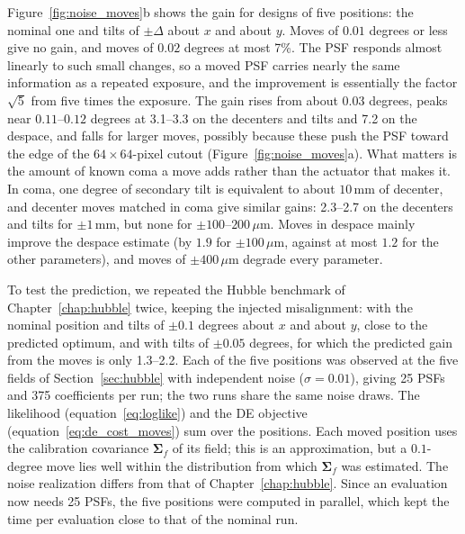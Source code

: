 Figure~\ref{fig:noise_moves}b shows the gain for designs of five positions: the nominal one and tilts of $\pm\Delta$ about $x$ and about $y$. Moves of $0.01$ degrees or less give no gain, and moves of $0.02$ degrees at most 7\%. The PSF responds almost linearly to such small changes, so a moved PSF carries nearly the same information as a repeated exposure, and the improvement is essentially the factor $\sqrt{5}$ from five times the exposure. The gain rises from about $0.03$ degrees, peaks near $0.11$--$0.12$ degrees at 3.1--3.3 on the decenters and tilts and 7.2 on the despace, and falls for larger moves, possibly because these push the PSF toward the edge of the $64\times64$-pixel cutout (Figure~\ref{fig:noise_moves}a). What matters is the amount of known coma a move adds rather than the actuator that makes it. In coma, one degree of secondary tilt is equivalent to about $10$\,mm of decenter, and decenter moves matched in coma give similar gains: 2.3--2.7 on the decenters and tilts for $\pm1$\,mm, but none for $\pm100$--$200\,\mu\mathrm{m}$. Moves in despace mainly improve the despace estimate (by $1.9$ for $\pm100\,\mu\mathrm{m}$, against at most $1.2$ for the other parameters), and moves of $\pm400\,\mu\mathrm{m}$ degrade every parameter.

To test the prediction, we repeated the Hubble benchmark of Chapter~\ref{chap:hubble} twice, keeping the injected misalignment: with the nominal position and tilts of $\pm0.1$ degrees about $x$ and about $y$, close to the predicted optimum, and with tilts of $\pm0.05$ degrees, for which the predicted gain from the moves is only 1.3--2.2. Each of the five positions was observed at the five fields of Section~\ref{sec:hubble} with independent noise ($\sigma=0.01$), giving 25 PSFs and 375 coefficients per run; the two runs share the same noise draws. The likelihood (equation~\ref{eq:loglike}) and the DE objective (equation~\ref{eq:de_cost_moves}) sum over the positions. Each moved position uses the calibration covariance $\boldsymbol{\Sigma}_f$ of its field; this is an approximation, but a $0.1$-degree move lies well within the distribution from which $\boldsymbol{\Sigma}_f$ was estimated. The noise realization differs from that of Chapter~\ref{chap:hubble}. Since an evaluation now needs 25 PSFs, the five positions were computed in parallel, which kept the time per evaluation close to that of the nominal run.

